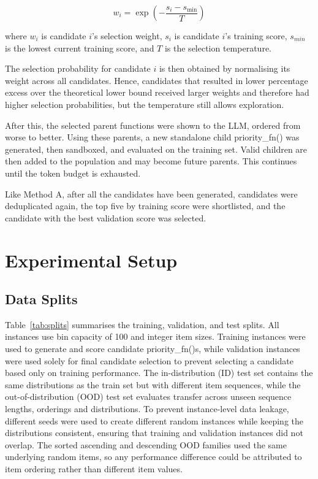 \documentclass[12pt]{article}
\begin{document}
\begin{equation}\label{eq:weight} w_i = \exp\!\left(-\frac{s_i-s_{\min}}{T}\right)\end{equation}

where $w_i$ is candidate $i$'s selection weight, $s_i$ is candidate $i$'s training score, $s_{min}$ is the lowest current training score, and $T$ is the selection temperature.

The selection probability for candidate $i$ is then obtained by normalising its weight across all candidates. Hence, candidates that resulted in lower percentage excess over the theoretical lower bound received larger weights and therefore had higher selection probabilities, but the temperature still allows exploration.

After this, the selected parent functions were shown to the LLM, ordered from worse to better. Using these parents, a new standalone child priority\_fn() was generated, then sandboxed, and evaluated on the training set. Valid children are then added to the population and may become future parents. This continues until the token budget is exhausted.

Like Method A, after all the candidates have been generated, candidates were deduplicated again, the top five by training score were shortlisted, and the candidate with the best validation score was selected.
\section{Experimental Setup}
\subsection{Data Splits}

Table~\ref{tab:splits} summarises the training, validation, and test splits. All instances use bin capacity of 100 and integer item sizes. Training instances were used to generate and score candidate priority\_fn()s, while validation instances were used solely for final candidate selection to prevent selecting a candidate based only on training performance. The in-distribution (ID) test set contains the same distributions as the train set but with different item sequences, while the out-of-distribution (OOD) test set evaluates transfer across unseen sequence lengths, orderings and distributions. To prevent instance-level data leakage, different seeds were used to create different random instances while keeping the distributions consistent, ensuring that training and validation instances did not overlap. The sorted ascending and descending OOD families used the same underlying random items, so any performance difference could be attributed to item ordering rather than different item values.
\end{document}
